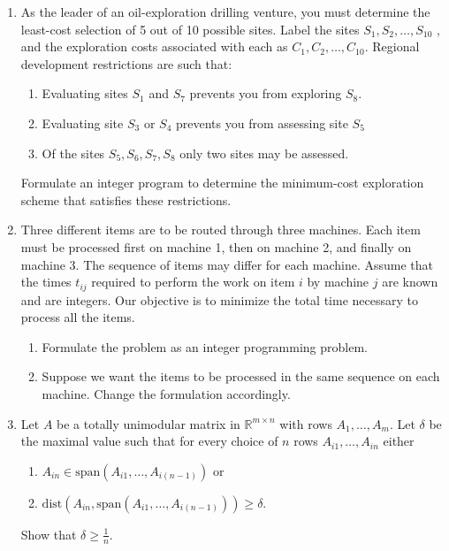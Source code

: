 \documentclass[11pt,a4paper]{article}
\renewcommand{\geq}{\geqslant}
\begin{document}
\begin{enumerate}
\item As the leader of an oil-exploration drilling venture, you must determine the least-cost selection of 5 out of 10 possible sites. Label the sites $S_1 , S_2 ,\hdots, S_{10}$ , and the exploration costs associated with each as $C_1 ,C_2 ,\hdots,C_{10}$.
Regional development restrictions are such that:
\begin{enumerate}
    \item Evaluating sites $S_1$ and $S_7$ prevents you from exploring $S_8$.
    \item Evaluating site $S_3$ or $S_4$ prevents you from assessing site $S_5$
    \item Of the sites $S_5, S_6, S_7, S_8$ only two sites may be assessed. 
\end{enumerate}
Formulate an integer program to determine the minimum-cost exploration scheme that satisfies these restrictions.

\item Three different items are to be routed through three machines. Each item must be processed first on machine 1, then
on machine 2, and finally on machine 3. The sequence of items may differ for each machine. Assume that the times
$t_{ij}$ required to perform the work on item $i$ by machine $j$ are known and are integers. Our objective is to minimize the total time necessary to process all the items.
\begin{enumerate}
    \item Formulate the problem as an integer programming problem.
    \item Suppose we want the items to be processed in the same sequence on each machine. Change the formulation accordingly.
\end{enumerate}

\item Let $A$ be a totally unimodular matrix in $\mathbb{R}^{m \times n}$ with rows $A_1, \hdots, A_m$. Let $\delta$ be the maximal value such that for every choice of $n$ rows $A_{i1}, \hdots, A_{in}$ either 
\begin{enumerate}
    \item $A_{in} \in \text{span}(A_{i1}, \hdots, A_{i(n-1)})$ or 
    \item $\text{dist}(A_{in}, \text{span}(A_{i1}, \hdots, A_{i(n-1)})) \geq \delta$. 
\end{enumerate}
Show that $\delta \geq \frac{1}{n}$. 


\end{enumerate}
\end{document}

